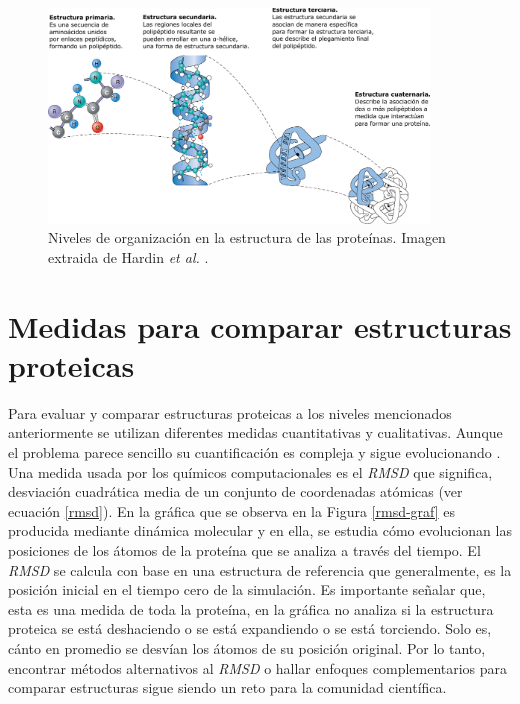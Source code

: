 \begin{figure}[h!]
	\centering
	\includegraphics[width=0.9\textwidth]{graphs/niveles.pdf}
	\caption{Niveles de organizaci\'{o}n en la estructura de las prote\'{i}nas. Imagen extraida de Hardin \textit{et al.} \cite{Hardin2022}.}
	\label{fig:nivelesP}
\end{figure}

\section{Medidas para comparar estructuras proteicas}

Para evaluar y comparar estructuras proteicas a los niveles mencionados anteriormente se utilizan diferentes medidas cuantitativas y cualitativas. Aunque el problema parece sencillo su cuantiﬁcaci\'{o}n es compleja y sigue evolucionando \cite{Kufareva2012}. Una medida usada por los qu\'{i}micos computacionales es el \textit{RMSD} que significa, desviaci\'{o}n cuadr\'{a}tica media de un conjunto de coordenadas at\'{o}micas (ver ecuaci\'{o}n \ref{rmsd}). En la gr\'{a}ﬁca que se observa en la Figura \ref{rmsd-graf} es producida mediante din\'{a}mica molecular y en ella, se estudia c\'{o}mo evolucionan las posiciones de los \'{a}tomos de la prote\'{i}na que se analiza a trav\'{e}s del tiempo. El \textit{RMSD} se calcula con base en una estructura de referencia que generalmente, es la posici\'{o}n inicial en el tiempo cero de la simulaci\'{o}n. Es importante señalar que, esta es una medida de toda la prote\'{i}na, en la gr\'{a}ﬁca no analiza si la estructura proteica se est\'{a} deshaciendo o se est\'{a} expandiendo o se est\'{a} torciendo. Solo es, c\'{a}nto en promedio se desv\'{i}an los \'{a}tomos de su posici\'{o}n original. Por lo tanto, encontrar m\'{e}todos alternativos al \textit{RMSD} o hallar enfoques complementarios para comparar estructuras sigue siendo un reto para la comunidad cient\'{i}ﬁca.


